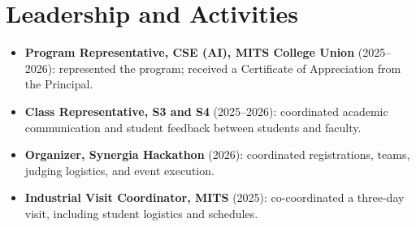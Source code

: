 \documentclass[a4paper,10pt]{article}
\begin{document}
\section{Leadership and Activities}
\begin{itemize}
  \item \textbf{Program Representative, CSE (AI), MITS College Union} (2025--2026): represented the program; received a Certificate of Appreciation from the Principal.
  \item \textbf{Class Representative, S3 and S4} (2025--2026): coordinated academic communication and student feedback between students and faculty.
  \item \textbf{Organizer, Synergia Hackathon} (2026): coordinated registrations, teams, judging logistics, and event execution.
  \item \textbf{Industrial Visit Coordinator, MITS} (2025): co-coordinated a three-day visit, including student logistics and schedules.
\end{itemize}
\end{document}
